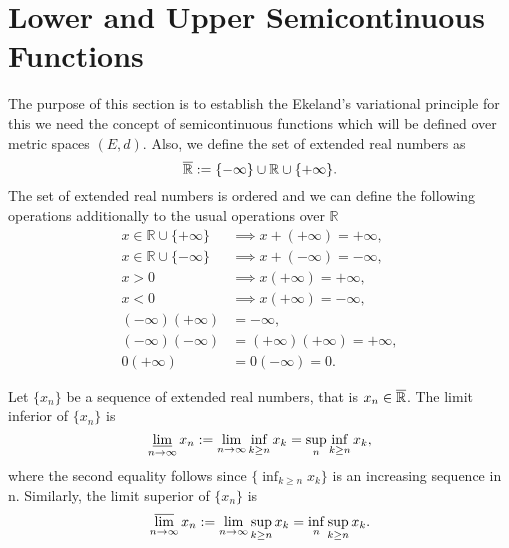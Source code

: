 \section{Lower and Upper Semicontinuous Functions} 


    The purpose of this section is to establish the Ekeland's variational 
    principle {\cite{guler2010foundations}} for this we need the concept of 
    semicontinuous functions which will be defined over metric spaces $(E,d)$. 
    Also, we  define the set of extended real numbers as
    $$
        \overline{\mathbb{R}} := \{- \infty \} \cup \mathbb{R} \cup \{ + \infty \}.
    $$
    The set of extended real numbers is ordered and we can define the following 
    operations additionally to the usual operations over $\mathbb{R}$
    \begin{align*}
        x \in \mathbb{R} \cup \{+\infty\} &\implies x + (+ \infty) = +\infty, \\
        x \in \mathbb{R} \cup \{-\infty\} &\implies x + (- \infty) = -\infty, \\
        x > 0 &\implies x(+ \infty) = + \infty, \\
        x < 0 &\implies x(+ \infty) = - \infty, \\
        (- \infty)(+ \infty) &= -\infty, \\
        (- \infty)(- \infty) &= (+ \infty)(+ \infty) = + \infty, \\
        0(+ \infty) &= 0(-\infty) = 0.
    \end{align*}
    \begin{definition}
        Let $\{ x_n \}$ be a sequence of extended real numbers, that is 
        $x_n \in \overline{\mathbb{R}}$. The limit inferior of $\{ x_n \}$ is
        $$
            \varliminf_{n \to \infty} x_n := \lim_{n \to \infty} \inf_{k \geq 
            n}{x_{k}} %
            = \sup_{n} \inf_{k \geq n}{x_k},
        $$
        where the second equality follows since $\{ \inf_{k \geq n}{x_k} \}$ 
        is an increasing sequence in n. Similarly, the limit superior of 
        $\{ x_n \}$ is
        $$
            \varlimsup_{n \to \infty} x_n := \lim_{n \to \infty} \sup_{k \geq 
            n}{x_{k}} %
            = \inf_{n} \sup_{k \geq n}{x_k}.
        $$
    \end{definition}

